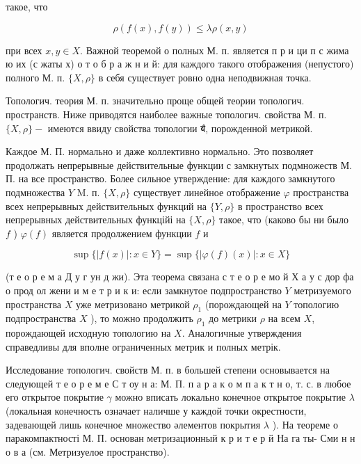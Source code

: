 \documentclass[10pt]{article}
\begin{document}
такое, что



\[

\rho(f(x), f(y)) \leqslant \lambda \rho(x, y)

\]



при всех $x, y \in X$. Важной теоремой о полных М. п. является п р и ци п с жима ю их (с жаты х) о т о б р а ж н и й: для каждого такого отображения (непустого) полного М. п. $\{X, \rho\}$ в себя существует ровно одна неподвижная точка.



Топологич. теория М. п. значительно проще общей теории топологич. пространств. Ниже приводятся наиболее важные топологич. свойства М. п. $\{X, \rho\}-$ имеются ввиду свойства топологии ब̊, порожденной метрикой.



Каждое М. П. нормально и даже коллективно нормально. Это позволяет продолжать непрерывные действительные функции с замкнутых подмножеств М. П. на все пространство. Более сильное утверждение: для каждого замкнутого подмножества $Y$ M. п. $\{X, \rho\}$ существует линейное отображение $\varphi$ пространства всех непрерывных действительных функций на $\{Y, \rho\}$ в пространство всех непрерывных действительных функційі на $\{X, \rho\}$ такое, что (каково бы ни было $f$ ) $\varphi(f)$ является продолжением функции $f$ и



\[

\sup \{|f(x)|: x \in Y\}=\sup \{|\varphi(f)(x)|: x \in X\}

\]



(т е о р е м а Д у г ун д жи). Эта теорема связана с т е о р е мо й Х а у с дор фа о прод ол жени и м е т р и к и: если замкнутое подпространство $Y$ метризуемого пространства $X$ уже метризовано метрикой $\rho_{1}$ (порождающей на $Y$ топологию подпространства $X$ ), то можно продолжить $\rho_{1}$ до метрики $\rho$ на всем $X$, порождающей исходную топологию на $X$. Аналогичные утверждения справедливы для вполне ограниченных метрик и полных метрік.



Исследование топологич. свойств М. п. в большей степени основывается на следующей т е о р е м е С т оу н а: М. П. п а р а к о м п а к т н о, т. с. в любое его открытое покрытие $\gamma$ можно вписать локально конечное открытое покрытие $\lambda$ (локальная конечность означает наличше у каждой точки окрестности, задевающей лишь конечное множество әлементов покрытия $\lambda$ ). На теореме о паракомпактності М. П. основан метризационный к р и т е р й На га ты- Сми н н о в а (см. Метризуелое пространство).
\end{document}
